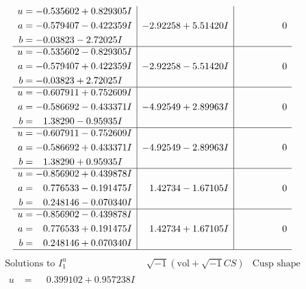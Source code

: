 \documentclass[1p]{elsarticle_modified}
\theoremstyle{definition}
\newcommand{\I}{\sqrt{-1}}
\begin{document}
$$\begin{array}{c|c|c}
\begin{aligned}
u &= -0.535602 + 0.829305 I \\
a &= -0.579407 - 0.422359 I \\
b &= -0.03823 - 2.72025 I\end{aligned}
 & -2.92258 + 5.51420 I & \phantom{-0.000000 } 0 \\ \hline\begin{aligned}
u &= -0.535602 - 0.829305 I \\
a &= -0.579407 + 0.422359 I \\
b &= -0.03823 + 2.72025 I\end{aligned}
 & -2.92258 - 5.51420 I & \phantom{-0.000000 } 0 \\ \hline\begin{aligned}
u &= -0.607911 + 0.752609 I \\
a &= -0.586692 - 0.433371 I \\
b &= \phantom{-}1.38290 - 0.95935 I\end{aligned}
 & -4.92549 + 2.89963 I & \phantom{-0.000000 } 0 \\ \hline\begin{aligned}
u &= -0.607911 - 0.752609 I \\
a &= -0.586692 + 0.433371 I \\
b &= \phantom{-}1.38290 + 0.95935 I\end{aligned}
 & -4.92549 - 2.89963 I & \phantom{-0.000000 } 0 \\ \hline\begin{aligned}
u &= -0.856902 + 0.439878 I \\
a &= \phantom{-}0.776533 - 0.191475 I \\
b &= \phantom{-}0.248146 - 0.070340 I\end{aligned}
 & \phantom{-}1.42734 - 1.67105 I & \phantom{-0.000000 } 0 \\ \hline\begin{aligned}
u &= -0.856902 - 0.439878 I \\
a &= \phantom{-}0.776533 + 0.191475 I \\
b &= \phantom{-}0.248146 + 0.070340 I\end{aligned}
 & \phantom{-}1.42734 + 1.67105 I & \phantom{-0.000000 } 0\\
 \hline 
 \end{array}$$\newpage$$\begin{array}{c|c|c}  
\text{Solutions to }I^u_{1}& \I (\text{vol} + \sqrt{-1}CS) & \text{Cusp shape}\\
 \hline 
\begin{aligned}
u &= \phantom{-}0.399102 + 0.957238 I \\

\end{aligned}
\end{array}$$
\end{document}
